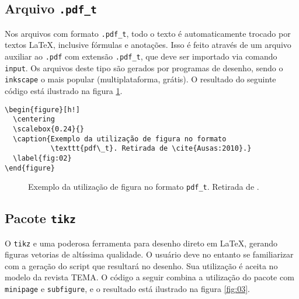 \documentclass{TEMA}
\begin{document}
\subsection{Arquivo \texttt{.pdf\_t}}

Nos arquivos com formato \texttt{.pdf\_t}, todo o texto é automaticamente
trocado por textos \LaTeX, inclusive fórmulas e anotações. Isso é feito
através de um arquivo auxiliar ao \texttt{.pdf} com extensão 
\texttt{.pdf\_t}, que deve ser importado via comando \texttt{input}.
Os arquivos deste tipo são gerados por programas de desenho, sendo 
o \texttt{inkscape} o mais popular (multiplataforma, grátis).
O resultado do seguinte código está ilustrado na figura \ref{fig:02}.


\begin{framed}
\begin{verbatim}
\begin{figure}[h!]
  \centering
  \scalebox{0.24}{}
  \caption{Exemplo da utilização de figura no formato 
           \texttt{pdf\_t}. Retirada de \cite{Ausas:2010}.} 
  \label{fig:02}
\end{figure}
\end{verbatim}
\end{framed}

\begin{figure}[h!]
  \centering
  \scalebox{0.24}{}
  \caption{Exemplo da utilização de figura no formato 
           \texttt{pdf\_t}. Retirada de \cite{Ausas:2010}.} 
  \label{fig:02}
\end{figure}

\subsection{Pacote \texttt{tikz}}

O \texttt{tikz} e uma poderosa ferramenta para desenho direto
em \LaTeX, gerando figuras vetorias de altíssima qualidade. O
usuário deve no entanto se familiarizar com a geração do script 
que resultará no desenho. Sua utilização é aceita no modelo
da revista TEMA. O código a seguir combina a utilização do 
pacote com \texttt{minipage} e \texttt{subfigure}, e o 
resultado está ilustrado na figura \ref{fig:03}.
\end{document}

